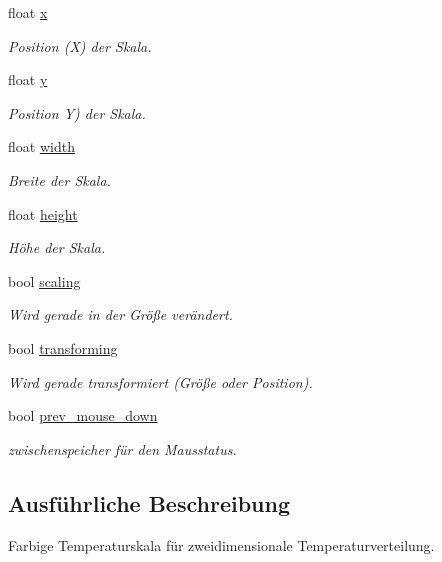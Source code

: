 \begin{DoxyCompactItemize}
float \hyperlink{classGUIColorScalePanel_a41599e2046e6766d5276c95d4aa54ad3}{x}
\begin{DoxyCompactList}\small\item\em Position (X) der Skala. \end{DoxyCompactList}\item 
float \hyperlink{classGUIColorScalePanel_a5a33f7666c1c49ca8cfe2e4de3dd06e0}{y}
\begin{DoxyCompactList}\small\item\em Position Y) der Skala. \end{DoxyCompactList}\item 
float \hyperlink{classGUIColorScalePanel_a1bc7bdf89d2447cddd08f5ae5f6638fa}{width}
\begin{DoxyCompactList}\small\item\em Breite der Skala. \end{DoxyCompactList}\item 
float \hyperlink{classGUIColorScalePanel_a5bbc9ff741f566a75f757e54324dac5a}{height}
\begin{DoxyCompactList}\small\item\em Höhe der Skala. \end{DoxyCompactList}\item 
bool \hyperlink{classGUIColorScalePanel_aec005c07c64a17ffe6d362f4de0a04b1}{scaling}
\begin{DoxyCompactList}\small\item\em Wird gerade in der Größe verändert. \end{DoxyCompactList}\item 
bool \hyperlink{classGUIColorScalePanel_a3330450ed906fb99f56ed825d53f69e1}{transforming}
\begin{DoxyCompactList}\small\item\em Wird gerade transformiert (Größe oder Position). \end{DoxyCompactList}\item 
bool \hyperlink{classGUIColorScalePanel_ac7050aa7729236561154b0b9be894ed6}{prev\-\_\-mouse\-\_\-down}
\begin{DoxyCompactList}\small\item\em zwischenspeicher für den Mausstatus. \end{DoxyCompactList}\end{DoxyCompactItemize}


\subsection{Ausführliche Beschreibung}
Farbige Temperaturskala für zweidimensionale Temperaturverteilung. 

